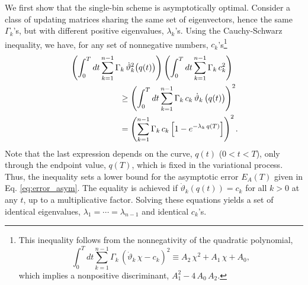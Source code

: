 \documentclass[reprint, superscriptaddress, floatfix]{revtex4-1}
\newcommand{\Err}{E}
\begin{document}
We first show
that the single-bin scheme is asymptotically optimal.
%
Consider a class of updating matrices
sharing the same set of eigenvectors,
hence the same $\Gamma_k$'s,
but with different positive eigenvalues,
$\lambda_k$'s.
%
Using the Cauchy-Schwarz inequality, we have,
for any set of nonnegative numbers, $c_k$'s\footnote{This
inequality follows from the nonnegativity of
the quadratic polynomial,
$$
\int_0^T
  dt \sum_{k = 1}^{n-1} \Gamma_k \,
    \left( {\dot \vartheta}_k \, \chi - c_k \right)^2
  \equiv
  A_2 \, \chi^2 + A_1 \, \chi + A_0
  ,
$$
which implies a nonpositive discriminant,
$A_1^2 - 4 \, A_0 \, A_2$.}
%
%
\begin{align}
  &
  \left(
    \int_0^T dt
      \sum_{k = 1}^{n-1}
        \Gamma_k \, {\dot \vartheta}_k^2\bigl( q(t) \bigr)
  \right)
  \left(
    \int_0^T dt
      \sum_{k = 1}^{n-1}
        \Gamma_k \, c_k^2
  \right)
  \notag
  \\
  &
  \qquad \qquad \qquad
  \ge
  \left(
    \int_0^T dt
      \sum_{k = 1}^{n-1}
        \Gamma_k \, c_k \, {\dot \vartheta}_k \, \bigl( q(t) \bigr)
  \right)^2
  \notag
  \\
  &
  \qquad \qquad \qquad
  =
  \left(
    \sum_{k = 1}^{n-1} \Gamma_k \, c_k
      \left[
        1 - e^{ -\lambda_k \, q(T) }
      \right]
  \right)^2.
  \notag
\end{align}
%
Note that the last expression %
depends on the curve, $q(t)$ ($0 < t < T$),
only through the endpoint value, $q(T)$,
which is fixed in the variational process.
%
Thus, the inequality sets a lower bound
for the asymptotic error $\Err_A(T)$
given in Eq. \eqref{eq:error_asym}.
%
The equality is achieved
if $\dot \vartheta_k\left( q(t) \right) = c_k$
for all $k > 0$ at any $t$,
up to a multiplicative factor.
%
Solving these equations yields
a set of identical eigenvalues,
$\lambda_1 = \cdots = \lambda_{n-1}$
and identical $c_k$'s.
\end{document}
